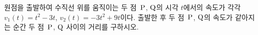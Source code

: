 원점을 출발하여 수직선 위를 움직이는 두 점~$\mathrm{P}$, $\mathrm{Q}$의 시각 $t$에서의 속도가 각각 $v_1(t)=t^2-3t$, $v_2(t)=-3t^2+9t$이다. 출발한 후 두 점~$\mathrm{P}$, $\mathrm{Q}$의 속도가 같아지는 순간 두 점~$\mathrm{P}$, $\mathrm{Q}$ 사이의 거리를 구하시오.
